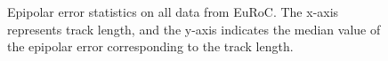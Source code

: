 \begin{figure}[h]
    \caption{Epipolar error statistics on all data from EuRoC. The x-axis represents track length, and the y-axis indicates the median value of the epipolar error corresponding to the track length.}
    \label{fig:Epipolar_Error}
\end{figure}


